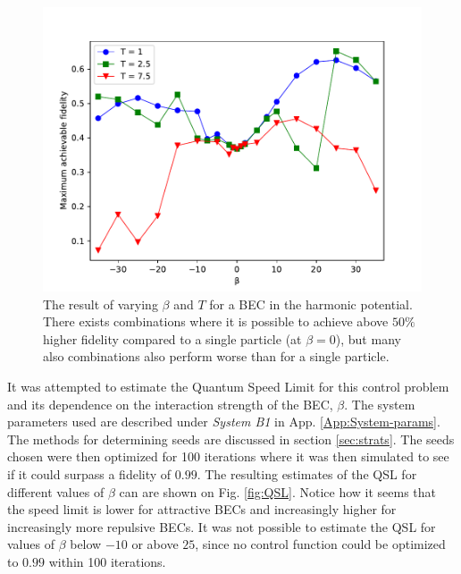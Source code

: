 \documentclass[a4paper, twocolumn]{revtex4-1}
\begin{document}
\begin{figure}[h]
	\includegraphics[width=\columnwidth]{graphics/exploration/betaTHO.pdf}
	\caption{The result of varying $\beta$ and $T$ for a BEC in the harmonic potential. There exists combinations where it is possible to achieve above $50\%$ higher fidelity compared to a single particle (at $\beta=0$), but many also combinations also perform worse than for a single particle.}
	\label{fig:HO}
\end{figure}

It was attempted to estimate the Quantum Speed Limit for this control problem and its dependence on the interaction strength of the BEC, $\beta$. The system parameters used are described under \textit{System B1} in App. \ref{App:System-params}. The methods for determining seeds are discussed in section \ref{sec:strats}. The seeds chosen were then optimized for 100 iterations where it was then simulated to see if it could surpass a fidelity of $0.99$.
The resulting estimates of the QSL for different values of $\beta$ can are shown on Fig. \ref{fig:QSL}. Notice how it seems that the speed limit is lower for attractive BECs and increasingly higher for increasingly more repulsive BECs. It was not possible to estimate the QSL for values of $\beta$ below $-10$ or above $25$, since no control function could be optimized to $0.99$ within 100 iterations. \\
\end{document}
